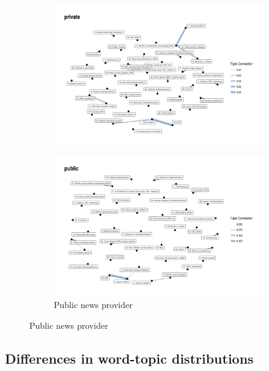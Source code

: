 \documentclass[12pt,a4paper,notitlepage]{article}
\begin{document}
\begin{figure}[H]
	\caption{Topic Correlation}
		\begin{center}
		\begin{subfigure}{.7\textwidth}
			\includegraphics[width=\textwidth]{../figs/corrplot1.png}	
		\end{subfigure}
		\begin{subfigure}{.7\textwidth}
			\includegraphics[width=\textwidth]{../figs/corrplot2}
			\caption{Public news provider}	
		\end{subfigure}
		\end{center}
	\label{fig_topic_correlations}
\end{figure}


\subsection{Differences in word-topic distributions}\label{ch_similarity}
\end{document}
